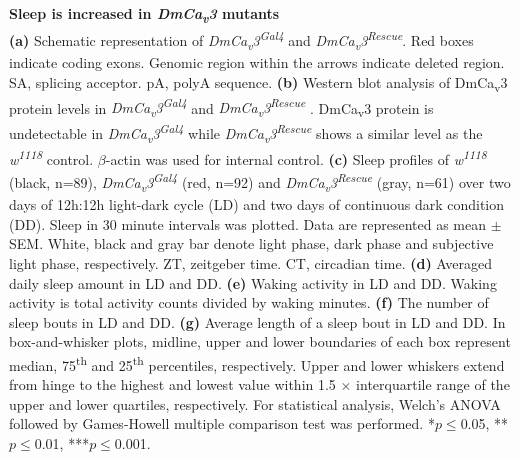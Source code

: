 \label{fig:3}
\textbf{Sleep is increased in \emph{DmCa\textsubscript{v}3} mutants}
\\
\textbf{(a)} Schematic representation of \emph{DmCa\textsubscript{v}3\textsuperscript{Gal4}} and \emph{DmCa\textsubscript{v}3\textsuperscript{Rescue}}. 
Red boxes indicate coding exons.
Genomic region within the arrows indicate deleted region.
SA, splicing acceptor. pA, polyA sequence.  
\textbf{(b)} Western blot analysis of DmCa\textsubscript{v}3 protein levels in \emph{DmCa\textsubscript{v}3\textsuperscript{Gal4}} and \emph{DmCa\textsubscript{v}3\textsuperscript{Rescue}} .
DmCa\textsubscript{v}3 protein is undetectable in \emph{DmCa\textsubscript{v}3\textsuperscript{Gal4}} while \emph{DmCa\textsubscript{v}3\textsuperscript{Rescue}}  shows a similar level as the \emph{w\textsuperscript{1118}} control.
$\beta$-actin was used for internal control.
\textbf{(c)} Sleep profiles of \emph{w\textsuperscript{1118}} (black, n=89), \emph{DmCa\textsubscript{v}3\textsuperscript{Gal4}} (red, n=92) and \emph{DmCa\textsubscript{v}3\textsuperscript{Rescue}}  (gray, n=61) over two days of 12h:12h light-dark cycle (LD) and two days of continuous dark condition (DD).
Sleep in 30 minute intervals was plotted.
Data are represented as mean $\pm$ SEM.
White, black and gray bar denote light phase, dark phase and subjective light phase, respectively.
ZT, zeitgeber time.
CT, circadian time.
\textbf{(d)} Averaged daily sleep amount in LD and DD.
\textbf{(e)} Waking activity in LD and DD.
Waking activity is total activity counts divided by waking minutes.
\textbf{(f)} The number of sleep bouts in LD and DD.
\textbf{(g)} Average length of a sleep bout in LD and DD.
In box-and-whisker plots, midline, upper and lower boundaries of each box represent median, 75\textsuperscript{th} and 25\textsuperscript{th} percentiles, respectively.
Upper and lower whiskers extend from hinge to the highest and lowest value within 1.5 $\times$ interquartile range of the upper and lower quartiles, respectively.
For statistical analysis, Welch's ANOVA followed by Games-Howell multiple comparison test was performed.
*$p\le$0.05, **$p\le$0.01, ***$p\le$0.001.
  
  
  
  
  
  
  
  